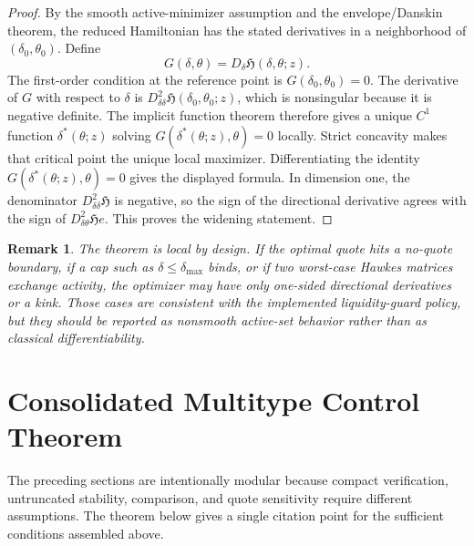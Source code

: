 \documentclass[11pt]{article}
\newtheorem{remark}[assumption]{Remark}
\begin{document}
\begin{proof}
By the smooth active-minimizer assumption and the envelope/Danskin theorem,
the reduced Hamiltonian has the stated derivatives in a neighborhood of
$(\delta_0,\theta_0)$. Define
\[
G(\delta,\theta)=D_\delta\mathfrak H(\delta,\theta;z).
\]
The first-order condition at the reference point is $G(\delta_0,\theta_0)=0$.
The derivative of $G$ with respect to $\delta$ is
$D^2_{\delta\delta}\mathfrak H(\delta_0,\theta_0;z)$, which is nonsingular
because it is negative definite. The implicit function theorem therefore gives
a unique $C^1$ function $\delta^*(\theta;z)$ solving
$G(\delta^*(\theta;z),\theta)=0$ locally. Strict concavity makes that critical
point the unique local maximizer. Differentiating the identity
$G(\delta^*(\theta;z),\theta)=0$ gives the displayed formula. In dimension
one, the denominator $D^2_{\delta\delta}\mathfrak H$ is negative, so the sign
of the directional derivative agrees with the sign of
$D^2_{\delta\theta}\mathfrak H e$. This proves the widening statement.
\end{proof}

\begin{remark}
The theorem is local by design. If the optimal quote hits a no-quote boundary,
if a cap such as $\delta\le\delta_{\max}$ binds, or if two worst-case Hawkes
matrices exchange activity, the optimizer may have only one-sided directional
derivatives or a kink. Those cases are consistent with the implemented
liquidity-guard policy, but they should be reported as nonsmooth active-set
behavior rather than as classical differentiability.
\end{remark}

\section{Consolidated Multitype Control Theorem}

The preceding sections are intentionally modular because compact verification,
untruncated stability, comparison, and quote sensitivity require different
assumptions. The theorem below gives a single citation point for the sufficient
conditions assembled above.
\end{document}

